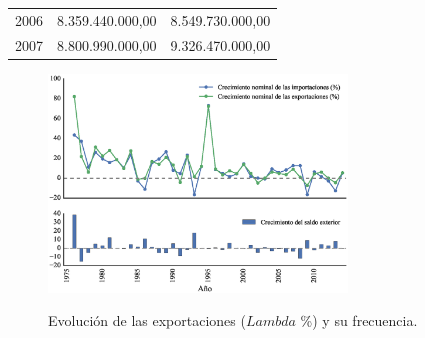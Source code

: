 \documentclass[a4paper,openright,12pt]{book}
\begin{document}
\begin{table}[]
\begin{tabular}{@{}lrr@{}}
2006 & 8.359.440.000,00                                                                                                      & 8.549.730.000,00                                                                                                      \\
2007 & 8.800.990.000,00                                                                                                      & 9.326.470.000,00                                                                                                      \\ \bottomrule
\end{tabular}
\end{table}

\begin{figure}[htb]
    \caption{Evolución de las exportaciones ($Lambda$ \%) y su frecuencia.}
    \centering
    \includegraphics[width=300px]{imgs/ev_dx.eps}
    \label{ev_x}
\end{figure}
\end{document}

